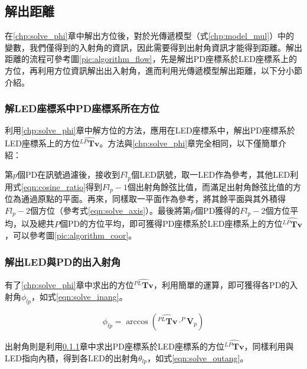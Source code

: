         

         

    


    \subsection{解出距離}
    \label{chp:solve_D}

    在\ref{chp:solve_phi}章中解出方位後，對於光傳遞模型（式\ref{chp:model_mul}）中的變數，我們僅得到的入射角的資訊，因此需要得到出射角資訊才能得到距離。解出距離的流程可參考圖\ref{pic:algorithm_flow}，先是解出PD座標系於LED座標系上的方位，再利用方位資訊解出出入射角，進而利用光傳遞模型解出距離，以下分小節介紹。

        \subsubsection{解LED座標系中PD座標系所在方位}
        \label{chp:solve_theta}

        利用\ref{chp:solve_phi}章中解方位的方法，應用在LED座標系中，解出PD座標系於LED座標系上的方位$\hat{{^{LP}\boldsymbol{Tv}}}$。方法與\ref{chp:solve_phi}章完全相同，以下僅簡單介紹：

        第$p$個PD在訊號過濾後，接收到$Fl_p$個LED訊號，取一LED作為參考，其他LED利用式\ref{eqn:cosine_ratio}得到$Fl_p-1$個出射角餘弦比值，而滿足出射角餘弦比值的方位為通過原點的平面。再來，同樣取一平面作為參考，將其餘平面與其外積得$Fl_p-2$個方位（參考式\ref{eqn:solve_axis}）。最後將第$p$個PD獲得的$Fl_p-2$個方位平均，以及總共$P$個PD的方位平均，即可獲得PD座標系於LED座標系上的方位$\hat{{^{LP}\boldsymbol{Tv}}}$，可以參考圖\ref{pic:algorithm_coor}。


        \subsubsection{解出LED與PD的出入射角}
        \label{chp:solve_ang}

        有了\ref{chp:solve_phi}章中求出的方位$\hat{{^{PL}\boldsymbol{Tv}}}$，利用簡單的運算，即可獲得各PD的入射角$\phi_{lp}$，如式\ref{eqn:solve_inang}。
        
        
        \begin{equation}
            \label{eqn:solve_inang}
            \phi_{lp} = \arccos(\hat{{^{PL}\boldsymbol{Tv}}}\cdot ^P\boldsymbol{V}_p)
        \end{equation}
        
        出射角則是利用\ref{chp:solve_theta}章中求出PD座標系於LED座標系的方位$\hat{{^{LP}\boldsymbol{Tv}}}$，同樣利用與LED指向內積，得到各LED的出射角$\theta_{lp}$，如式\ref{eqn:solve_outang}。

